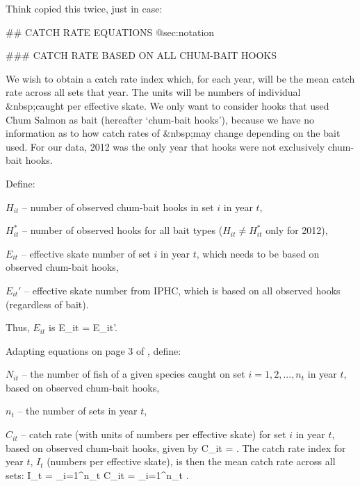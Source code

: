 Think copied this twice, just in case:




## CATCH RATE EQUATIONS {@sec:notation}

### CATCH RATE BASED ON ALL CHUM-BAIT HOOKS

We wish to obtain a catch rate index which, for each year, will be the mean
catch rate across all sets that year. The units will be numbers of  individual
\spName&nbsp;caught per effective skate. We only want to consider hooks that used
Chum Salmon as bait (hereafter `chum-bait hooks'), because we have no
information as to how catch rates of \spName&nbsp;may change depending on the bait
used. For our data, 2012 was the only year that hooks were not exclusively
chum-bait hooks.

Define:

$H_{it}$ -- number of observed chum-bait hooks in set $i$ in year
$t$, %

$H_{it}^*$ -- number of observed hooks for all bait types
($H_{it} \neq H_{it}^*$ only for 2012), %

$E_{it}$ -- effective skate number of set $i$ in year $t$, which needs to be
based on observed chum-bait
hooks, %

$E_{it}'$ -- effective skate number from IPHC, which is based on all observed
hooks (regardless of bait). %

Thus, $E_{it}$ is
\eb
E_{it} =  E_{it}'.
\ee

Adapting equations on page 3 of \citet{yocld08}, define:

$N_{it}$ -- the number of fish of a given species caught on set $i=1,2,...,n_t$
in year $t$, based on observed chum-bait hooks, %

$n_t$ -- the number of sets in year
$t$, %

$C_{it}$ -- catch rate (with units of numbers per effective skate) for set $i$ in year $t$, based on observed chum-bait hooks, given by
\eb
C_{it} = .
\label{catchPerSet}
\ee
The catch rate index for year $t$, $I_t$ (numbers per effective skate), is then
the mean catch rate across all sets:
\eb
I_{t} =  \sum_{i=1}^{n_t} C_{it} =  \sum_{i=1}^{n_t} .
\label{index}
\ee




